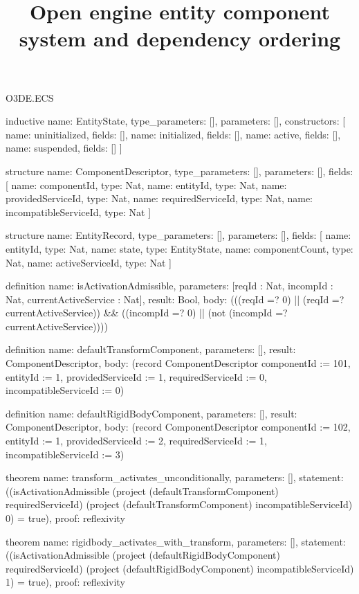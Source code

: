 \begin{lexlean}{O3DE.ECS}
\title{Open engine entity component system and dependency ordering}
\begin{semanticmodule}
inductive{
  name: EntityState,
  type_parameters: [],
  parameters: [],
  constructors: [
    {name: uninitialized, fields: []},
    {name: initialized, fields: []},
    {name: active, fields: []},
    {name: suspended, fields: []}
  ]
}

structure{
  name: ComponentDescriptor,
  type_parameters: [],
  parameters: [],
  fields: [
    {name: componentId, type: Nat},
    {name: entityId, type: Nat},
    {name: providedServiceId, type: Nat},
    {name: requiredServiceId, type: Nat},
    {name: incompatibleServiceId, type: Nat}
  ]
}

structure{
  name: EntityRecord,
  type_parameters: [],
  parameters: [],
  fields: [
    {name: entityId, type: Nat},
    {name: state, type: EntityState},
    {name: componentCount, type: Nat},
    {name: activeServiceId, type: Nat}
  ]
}

definition{
  name: isActivationAdmissible,
  parameters: [reqId : Nat, incompId : Nat, currentActiveService : Nat],
  result: Bool,
  body: (((reqId =? 0) || (reqId =? currentActiveService)) && ((incompId =? 0) || (not (incompId =? currentActiveService))))
}

definition{
  name: defaultTransformComponent,
  parameters: [],
  result: ComponentDescriptor,
  body: (record ComponentDescriptor {componentId := 101, entityId := 1, providedServiceId := 1, requiredServiceId := 0, incompatibleServiceId := 0})
}

definition{
  name: defaultRigidBodyComponent,
  parameters: [],
  result: ComponentDescriptor,
  body: (record ComponentDescriptor {componentId := 102, entityId := 1, providedServiceId := 2, requiredServiceId := 1, incompatibleServiceId := 3})
}

theorem{
  name: transform_activates_unconditionally,
  parameters: [],
  statement: ((isActivationAdmissible (project (defaultTransformComponent) requiredServiceId) (project (defaultTransformComponent) incompatibleServiceId) 0) = true),
  proof: reflexivity{}
}

theorem{
  name: rigidbody_activates_with_transform,
  parameters: [],
  statement: ((isActivationAdmissible (project (defaultRigidBodyComponent) requiredServiceId) (project (defaultRigidBodyComponent) incompatibleServiceId) 1) = true),
  proof: reflexivity{}
}


\end{semanticmodule}
\end{lexlean}
